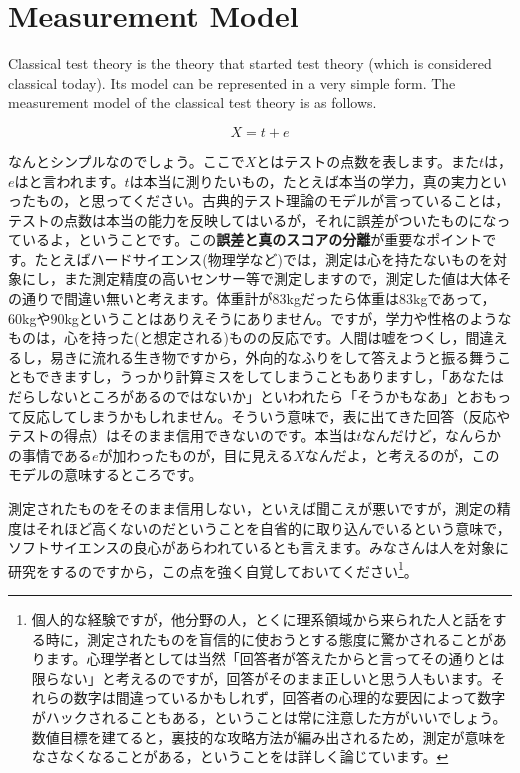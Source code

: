 \documentclass{ltjbook}
\begin{document}
\section{Measurement Model}
Classical test theory is the theory that started test theory (which is considered classical today). Its model can be represented in a very simple form. The measurement model of the classical test theory is as follows.

\[ X = t + e \]

なんとシンプルなのでしょう。ここで$X$とはテストの点数を表します。また$t$は，$e$はと言われます。$t$は本当に測りたいもの，たとえば本当の学力，真の実力といったもの，と思ってください。古典的テスト理論のモデルが言っていることは，テストの点数は本当の能力を反映してはいるが，それに誤差がついたものになっているよ，ということです。この\textbf{誤差と真のスコアの分離}が重要なポイントです。たとえばハードサイエンス(物理学など)では，測定は心を持たないものを対象にし，また測定精度の高いセンサー等で測定しますので，測定した値は大体その通りで間違い無いと考えます。体重計が83kgだったら体重は83kgであって，60kgや90kgということはありえそうにありません。ですが，学力や性格のようなものは，心を持った(と想定される)ものの反応です。人間は嘘をつくし，間違えるし，易きに流れる生き物ですから，外向的なふりをして答えようと振る舞うこともできますし，うっかり計算ミスをしてしまうこともありますし，「あなたはだらしないところがあるのではないか」といわれたら「そうかもなあ」とおもって反応してしまうかもしれません。そういう意味で，表に出てきた回答（反応やテストの得点）はそのまま信用できないのです。本当は$t$なんだけど，なんらかの事情である$e$が加わったものが，目に見える$X$なんだよ，と考えるのが，このモデルの意味するところです。

測定されたものをそのまま信用しない，といえば聞こえが悪いですが，測定の精度はそれほど高くないのだということを自省的に取り込んでいるという意味で，ソフトサイエンスの良心があらわれているとも言えます。みなさんは人を対象に研究をするのですから，この点を強く自覚しておいてください\footnote{個人的な経験ですが，他分野の人，とくに理系領域から来られた人と話をする時に，測定されたものを盲信的に使おうとする態度に驚かされることがあります。心理学者としては当然「回答者が答えたからと言ってその通りとは限らない」と考えるのですが，回答がそのまま正しいと思う人もいます。それらの数字は間違っているかもしれず，回答者の心理的な要因によって数字がハックされることもある，ということは常に注意した方がいいでしょう。数値目標を建てると，裏技的な攻略方法が編み出されるため，測定が意味をなさなくなることがある，ということを\textcite{Jerry2019}は詳しく論じています。}。
\end{document}
